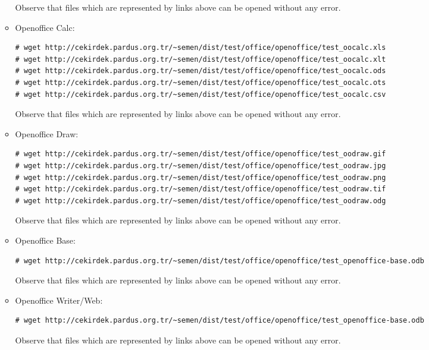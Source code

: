 \documentclass[a4paper,10pt]{article}
\begin{document}
\begin{enumerate}
\begin{itemize}
Observe that files which are represented by links above can be opened without any error.

\item Openoffice Calc:
\begin{verbatim}
# wget http://cekirdek.pardus.org.tr/~semen/dist/test/office/openoffice/test_oocalc.xls
# wget http://cekirdek.pardus.org.tr/~semen/dist/test/office/openoffice/test_oocalc.xlt
# wget http://cekirdek.pardus.org.tr/~semen/dist/test/office/openoffice/test_oocalc.ods
# wget http://cekirdek.pardus.org.tr/~semen/dist/test/office/openoffice/test_oocalc.ots
# wget http://cekirdek.pardus.org.tr/~semen/dist/test/office/openoffice/test_oocalc.csv	
\end{verbatim}

Observe that files which are represented by links above can be opened without any error.

\item Openoffice Draw:
\begin{verbatim}
# wget http://cekirdek.pardus.org.tr/~semen/dist/test/office/openoffice/test_oodraw.gif
# wget http://cekirdek.pardus.org.tr/~semen/dist/test/office/openoffice/test_oodraw.jpg
# wget http://cekirdek.pardus.org.tr/~semen/dist/test/office/openoffice/test_oodraw.png
# wget http://cekirdek.pardus.org.tr/~semen/dist/test/office/openoffice/test_oodraw.tif
# wget http://cekirdek.pardus.org.tr/~semen/dist/test/office/openoffice/test_oodraw.odg
\end{verbatim}

Observe that files which are represented by links above can be opened without any error.
\item Openoffice Base:
\begin{verbatim}
# wget http://cekirdek.pardus.org.tr/~semen/dist/test/office/openoffice/test_openoffice-base.odb
\end{verbatim}

Observe that files which are represented by links above can be opened without any error.

\item Openoffice Writer/Web:
\begin{verbatim}
# wget http://cekirdek.pardus.org.tr/~semen/dist/test/office/openoffice/test_openoffice-base.odb
\end{verbatim}

Observe that files which are represented by links above can be opened without any error.

\end{itemize}


\end{enumerate}
\end{document}
